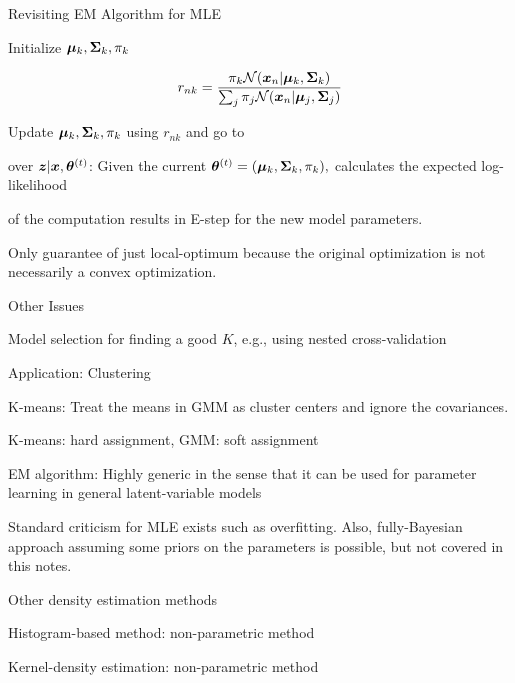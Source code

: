 \documentclass[handout,fleqn,aspectratio=169]{beamer}
\begin{document}
\begin{frame}{Revisiting EM Algorithm for MLE}

{
\small
\bce[\red \bf S1.]
\item Initialize $\bm{\mu}_k, \bm{\Sigma}_k, \pi_k$

\item {} 
$$
r_{nk}=  \frac{\pi_k {\cal N}(\bm{x}_n | \bm{\mu}_k, \bm{\Sigma}_k)}{ \sum_{j}\pi_j {\cal N}(\bm{x}_n | \bm{\mu}_j, \bm{\Sigma}_j) } 
$$

\item {} Update $\bm{\mu}_k, \bm{\Sigma}_k, \pi_k$ using $r_{nk}$
and go to 
\ece
}
{
\small
\bci
\item {}  over $\bm{z} | \bm{x}, \bm{\theta}^{(t)}$: 
Given the current $\bm{\theta}^{(t)} = (\bm{\mu}_k, \bm{\Sigma}_k, \pi_k),$ calculates the expected log-likelihood

\item {}  of the computation results in E-step for the new model parameters.  

\eci
}

\bci
\item Only guarantee of just local-optimum because the original optimization is not necessarily a convex optimization. \hfill {}
\eci

\end{frame}

\begin{frame}{Other Issues}

\plitemsep 0.1in
\bci
\item Model selection for finding a good $K$, e.g., using nested cross-validation

\item Application: Clustering
\bci
\item K-means: Treat the means in GMM as cluster centers and ignore the covariances. 
\item K-means: hard assignment, GMM: soft assignment
\eci

\item EM algorithm: Highly generic in the sense that it can be used for parameter learning in general latent-variable models

\item Standard criticism for MLE exists such as overfitting. Also, fully-Bayesian approach assuming some priors on the parameters is possible, but not covered in this notes. 

\item Other density estimation methods
\bci
\item Histogram-based method: non-parametric method
\item Kernel-density estimation: non-parametric method
\eci
\eci
\end{frame}
\end{document}
